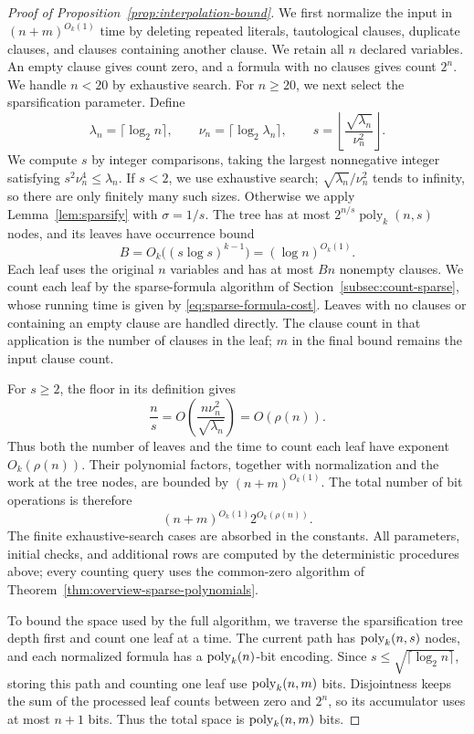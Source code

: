 \begin{proof}[Proof of Proposition~\ref{prop:interpolation-bound}]
We first normalize the input in $(n+m)^{O_k(1)}$ time by deleting repeated
literals, tautological clauses, duplicate clauses, and clauses
containing another clause. We retain all $n$ declared variables.
An empty clause gives count zero, and a formula with no clauses
gives count $2^n$. We handle $n<20$ by exhaustive search.
For $n\ge20$, we next select the sparsification parameter. Define
\[
 \lambda_n=\lceil\log_2 n\rceil,\qquad
 \nu_n=\lceil\log_2\lambda_n\rceil,\qquad
 s=\left\lfloor\frac{\sqrt{\lambda_n}}{\nu_n^2}\right\rfloor.
\]
We compute $s$ by integer comparisons, taking the largest
nonnegative integer satisfying $s^2\nu_n^4\le\lambda_n$.
If $s<2$, we use exhaustive search;
$\sqrt{\lambda_n}/\nu_n^2$ tends to infinity, so there are only
finitely many such sizes. Otherwise we apply Lemma~\ref{lem:sparsify}
with $\sigma=1/s$. The tree has at most
$2^{n/s}\operatorname{poly}_k(n,s)$ nodes, and its leaves have
occurrence bound
\[
 B=O_k\bigl((s\log s)^{k-1}\bigr)=(\log n)^{O_k(1)}.
\]
Each leaf uses the original $n$ variables and has at most $Bn$
nonempty clauses. We count each leaf by the sparse-formula algorithm
of Section~\ref{subsec:count-sparse}, whose running time is given by
\eqref{eq:sparse-formula-cost}. Leaves with no clauses or containing
an empty clause are handled directly.
The clause count in that application is the number of clauses in
the leaf; $m$ in the final bound remains the input clause count.

For $s\ge2$, the floor in its definition gives
\[
 \frac ns=O\!\left(\frac{n\nu_n^2}{\sqrt{\lambda_n}}\right)
 =O(\rho(n)).
\]
Thus both the number of leaves and the time to count each leaf
have exponent $O_k(\rho(n))$. Their polynomial factors, together
with normalization and the work at the tree nodes, are bounded by
$(n+m)^{O_k(1)}$. The total number of bit operations is therefore
\[
 (n+m)^{O_k(1)}2^{O_k(\rho(n))}.
\]
The finite exhaustive-search cases are absorbed in the constants.
All parameters, initial checks, and additional rows are computed
by the deterministic procedures above; every counting query uses
the common-zero algorithm of Theorem~\ref{thm:overview-sparse-polynomials}.

To bound the space used by the full algorithm, we traverse the
sparsification tree depth first and count one leaf at a time.
The current path has $\operatorname{poly}_k(n,s)$ nodes, and each normalized
formula has a $\operatorname{poly}_k(n)$-bit encoding. Since
$s\le\sqrt{\lceil\log_2 n\rceil}$, storing this path and counting one
leaf use $\operatorname{poly}_k(n,m)$ bits. Disjointness keeps the sum of the
processed leaf counts between zero and $2^n$, so its accumulator
uses at most $n+1$ bits. Thus the total space is $\operatorname{poly}_k(n,m)$ bits.
\end{proof}

